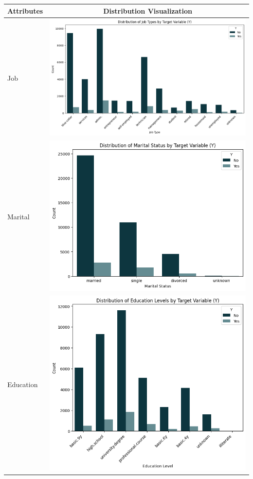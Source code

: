 \documentclass{article}
\begin{document}
           \begin{longtable}{|l|c|}
               \hline
               \textbf{Attributes} & \textbf{Distribution Visualization} \\
               \hline
               \endhead
               Job & \includegraphics[width=0.7\linewidth]{data/bank_marketing/pic/Bank_Add_job.png} \\ \hline
               Marital & \includegraphics[width=0.7\linewidth]{data/bank_marketing/pic/Bank_Add_marital.png} \\ \hline
               Education & \includegraphics[width=0.7\linewidth]{data/bank_marketing/pic/Bank_Add_edu.png} \\ \hline

\end{longtable}
\end{document}
